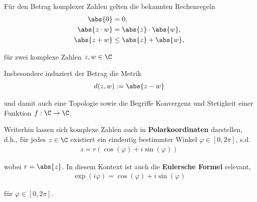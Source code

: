 \documentclass[letterpaper,10pt,german]{jupyterBook}
\begin{document}
\par
Für den Betrag komplexer Zahlen gelten die bekannten Rechenregeln
\begin{align*}
\abs{0}&=0,\\
\abs{z\cdot w} &= \abs{z}\cdot \abs{w},\\
\abs{z+w}&\leq\abs{z}+\abs{w},
\end{align*}
\par
für zwei komplexe Zahlen \(z,w\in\C\)

\par
Insbesondere induziert der Betrag die Metrik
\begin{align*}
d(z,w):= \abs{z-w}
\end{align*}
\par
und damit auch eine Topologie sowie die Begriffe Konvergenz und Stetigkeit einer Funktion \(f:\C\to\C\).

\par
Weiterhin lassen sich komplexe Zahlen auch in \textbf{Polarkoordinaten} darstellen, d.h., für jedes \(z\in\C\) existiert ein eindeutig bestimmter Winkel \(\varphi\in [0,2\pi]\), s.d.
\begin{align*}
z = r(\cos(\varphi) + i\sin(\varphi))
\end{align*}
\par
wobei \(r=\abs{z}\). In diesem Kontext ist auch die \textbf{Eulersche Formel} relevant,
\begin{align}\label{equation:complexanalysis/complexnumbers:eq:euler}
\exp(i\varphi) = \cos(\varphi) + i\sin(\varphi)
\end{align}
\par
für \(\varphi\in [0,2\pi]\).
\end{document}
